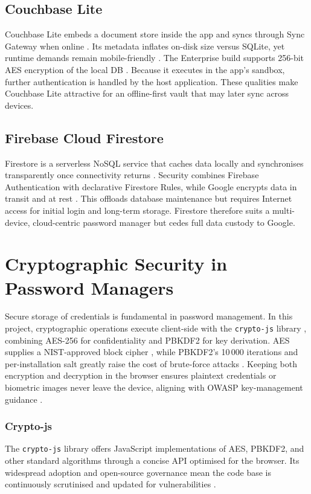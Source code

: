 \clearpage

\subsection*{Couchbase Lite}
Couchbase Lite embeds a document store inside the app and syncs through
Sync Gateway when online \autocite{Pal2016}.  Its metadata inflates on-disk
size versus SQLite, yet runtime demands remain mobile-friendly
\autocite{Gkamas2022}.  The Enterprise build supports 256-bit AES encryption
of the local DB \autocite{CouchbaseEncryption, CouchbaseDoc2025}.  Because it
executes in the app's sandbox, further authentication is handled by the host
application.  These qualities make Couchbase Lite attractive for an
offline-first vault that may later sync across devices.

\subsection*{Firebase Cloud Firestore}
Firestore is a serverless NoSQL service that caches data locally and
synchronises transparently once connectivity returns \autocite{FirebaseDoc2025}.
Security combines Firebase Authentication with declarative Firestore Rules,
while Google encrypts data in transit and at rest \autocite{FirebaseSecurity2025}.
This offloads database maintenance but requires Internet access for initial
login and long-term storage.  Firestore therefore suits a multi-device,
cloud-centric password manager but {\selectfont cedes full data custody to Google}.


\section{Cryptographic Security in Password Managers}
\label{sec:crypto}
Secure storage of credentials is fundamental in password management.
In this project, cryptographic operations execute client-side with the
\texttt{crypto-js} library \autocite{CryptoJS2024}, combining AES-256 for
confidentiality and PBKDF2 for key derivation.  AES supplies a
NIST-approved block cipher \autocite{NISTFIPS197}, while PBKDF2's 10\,000
iterations and per-installation salt greatly raise the cost of brute-force
attacks \autocite{RFC8018}.  Keeping both encryption and decryption in the
browser ensures plaintext credentials or biometric images never leave the
device, aligning with OWASP key-management guidance
\textcite{OWASPKeyMgmt2025}.

\subsubsection{Crypto-js}  
The \texttt{crypto-js} library offers JavaScript implementations of AES,
PBKDF2, and other standard algorithms through a concise API optimised for the
browser.  Its widespread adoption and open-source governance mean the code
base is continuously scrutinised and updated for vulnerabilities
\autocite{CryptoJS2024}.

